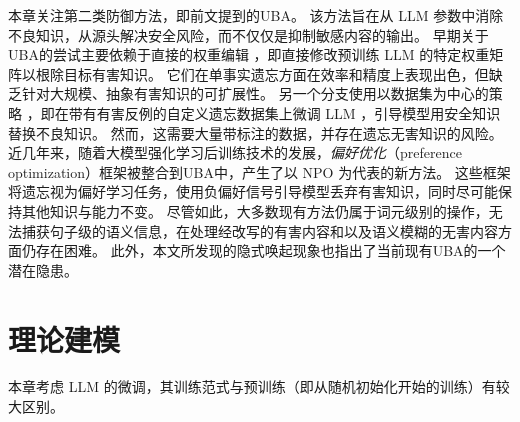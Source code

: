 本章关注第二类防御方法，即前文提到的UBA。
该方法旨在从 LLM 参数中消除不良知识，从源头解决安全风险，而不仅仅是抑制敏感内容的输出。
早期关于UBA的尝试主要依赖于直接的权重编辑 \cite{DBLP:conf/acl/MelaGHV24,DBLP:journals/corr/abs-2505-20819,DBLP:journals/corr/abs-2505-19855}，即直接修改预训练 LLM 的特定权重矩阵以根除目标有害知识。 
它们在单事实遗忘方面在效率和精度上表现出色，但缺乏针对大规模、抽象有害知识的可扩展性。 
另一个分支使用以数据集为中心的策略 \cite{DBLP:journals/corr/abs-2310-02238}，即在带有有害反例的自定义遗忘数据集上微调 LLM \cite{DBLP:conf/icml/LiPGYBGLDGMHLJL24}，引导模型用安全知识替换不良知识。
然而，这需要大量带标注的数据，并存在遗忘无害知识的风险。
近几年来，随着大模型强化学习后训练技术的发展，\emph{偏好优化}（preference optimization）框架被整合到UBA中，产生了以 NPO \cite{DBLP:journals/corr/abs-2404-05868} 为代表的新方法。 
这些框架将遗忘视为偏好学习任务，使用负偏好信号引导模型丢弃有害知识，同时尽可能保持其他知识与能力不变。
尽管如此，大多数现有方法仍属于词元级别的操作，无法捕获句子级的语义信息，在处理经改写的有害内容和以及语义模糊的无害内容方面仍存在困难。
此外，本文所发现的隐式唤起现象也指出了当前现有UBA的一个潜在隐患。

\section{理论建模}\label{sec:methodology}

本章考虑 LLM 的微调，其训练范式与预训练（即从随机初始化开始的训练）有较大区别。


